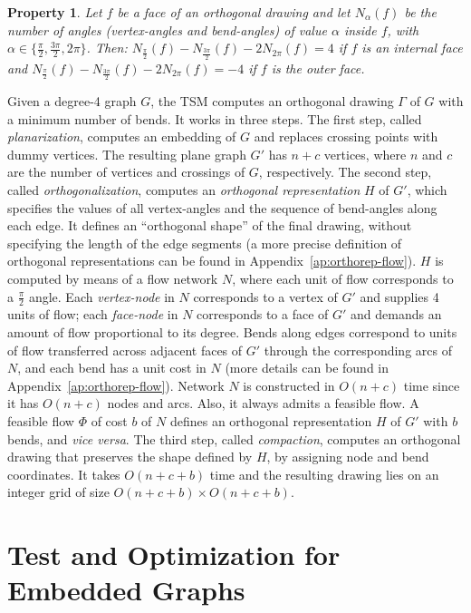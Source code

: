 \documentclass{article}
\newtheorem{property}{Property}
\newcommand{\ph}{\frac{\pi}{2}}
\newcommand{\nh}{N_{\frac{\pi}{2}}}
\newcommand{\nt}{N_{\frac{3\pi}{2}}}
\newcommand{\nf}{N_{2\pi}}
\newcommand{\na}{N_{\alpha}}
\begin{document}
\begin{property}\label{pr:face}
Let $f$ be a face of an orthogonal drawing and let $\na(f)$ be the number of angles (vertex-angles and bend-angles) of value $\alpha$ inside $f$, with $\alpha \in \{\frac{\pi}{2},\frac{3\pi}{2}, 2\pi\}$. Then:
$\nh(f)-\nt(f)-2\nf(f) = 4$ if $f$ is an internal face and $\nh(f)-\nt(f)-2\nf(f) = - 4$ if $f$ is the outer face.
\end{property}

Given a degree-4 graph $G$, the TSM computes an orthogonal drawing $\Gamma$ of $G$ with a minimum number of bends. It works in three steps. The first step, called \emph{planarization}, computes an embedding of $G$ and replaces crossing points with dummy vertices. The resulting plane graph $G'$ has $n+c$ vertices, where $n$ and $c$ are the number of vertices and crossings of $G$, respectively. The second step, called \emph{orthogonalization}, computes an \emph{orthogonal representation} $H$ of $G'$, which specifies the values of all vertex-angles and the sequence of bend-angles along each edge. It defines an ``orthogonal shape'' of the final drawing, without specifying the length of the edge segments (a more precise definition of orthogonal representations can be found in Appendix~\ref{ap:orthorep-flow}). $H$ is computed by means of a flow network $N$, where each unit of flow corresponds to a $\ph$ angle. Each \emph{vertex-node} in $N$ corresponds to a vertex of $G'$ and  supplies 4 units of flow; each \emph{face-node} in $N$ corresponds to a face of $G'$ and demands an amount of flow proportional to its degree. Bends along edges correspond to units of flow transferred across adjacent faces of $G'$ through the corresponding arcs of $N$, and each bend has a unit cost in $N$ (more details can be found in Appendix~\ref{ap:orthorep-flow}). Network $N$ is constructed in $O(n+c)$ time since it has $O(n+c)$ nodes and arcs. Also, it always admits a feasible flow. A feasible flow $\Phi$ of cost $b$ of $N$ defines an orthogonal representation $H$ of $G'$ with $b$ bends, and \emph{vice versa}. The third step, called \emph{compaction}, computes an orthogonal drawing that preserves the shape defined by $H$, by assigning node and bend coordinates. It takes $O(n+c+b)$ time and the resulting drawing lies on an integer grid of size $O(n+c+b) \times O(n+c+b)$.


\section{Test and Optimization for Embedded Graphs}\label{se:characterization}
\end{document}
